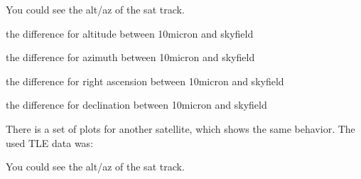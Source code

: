 \documentclass[a4paper,10pt,english]{sphinxmanual}
\begin{document}
\sphinxAtStartPar
You could see the alt/az of the sat track.


\sphinxAtStartPar
the difference for altitude between 10micron and skyfield


\sphinxAtStartPar
the difference for azimuth between 10micron and skyfield


\sphinxAtStartPar
the difference for right ascension between 10micron and skyfield


\sphinxAtStartPar
the difference for declination between 10micron and skyfield


\sphinxAtStartPar
There is a set of plots for another satellite, which shows the same behavior. The
used TLE data was:

\begin{sphinxVerbatim}[commandchars=\\\{\}]
             
        
\end{sphinxVerbatim}

\sphinxAtStartPar
You could see the alt/az of the sat track.

\end{document}

